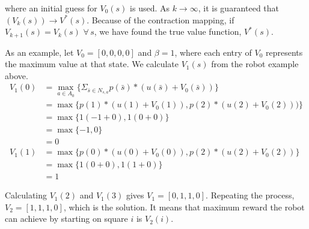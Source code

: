 where an initial guess for $V_0(s)$ is used.
As $k \to \infty$, it is guaranteed that $(V_k(s)) \to V^*(s)$.
Because of the contraction mapping, if $V_{k+1}(s) = V_k(s) \, \, \forall \, s$, we have found the true value function, $V^*(s)$.


As an example, let $V_0 = [0,0,0,0]$ and $\beta = 1$, where each entry of $V_0$ represents the maximum value at that state.
We calculate $V_1(s)$ from the robot example above.
\begin{align*}
V_1(0) &= \max_{a \in A_0} \{\Sigma_{\bar{s}\in N_{s,a}}p(\bar{s})*(u(\bar{s})+V_0(\bar{s}))\} \\
&= \max \{p(1)*(u(1)+V_0(1)), p(2)*(u(2)+V_0(2)))\} \\
&= \max \{1(-1+0), 1(0+0)\} \\
&= \max \{-1,0\} \\
&= 0\\
V_1(1) &= \max \{p(0)*(u(0)+V_0(0)), p(2)*(u(2)+V_0(2))\}\\
&=\max \{1(0+0), 1(1+0)\} \\
&= 1
\end{align*}

Calculating $V_1(2)$ and $V_1(3)$ gives $V_1 = [0, 1, 1, 0]$.
Repeating the process, $V_2 = [1, 1, 1, 0]$, which is the solution.
It means that maximum reward the robot can achieve by starting on square $i$ is $V_2(i)$.


